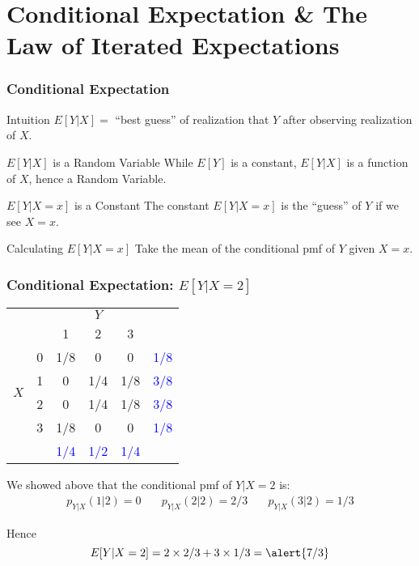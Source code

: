 \section{Conditional Expectation \& The Law of Iterated Expectations}
\begin{frame}
\frametitle{Conditional Expectation}
\begin{block}{Intuition}
	$E[Y|X] = $ ``best guess'' of realization that $Y$ after observing realization of $X$. 
\end{block}

\begin{block}{$E[Y|X]$ is a Random Variable}
While $E[Y]$ is a constant, $E[Y|X]$ is a function of $X$, hence a \alert{Random Variable}.
\end{block}

\begin{block}{$E[Y|X=x]$ is a Constant}
  The constant $E[Y|X=x]$ is the ``guess'' of $Y$ if we see $X=x$.
\end{block}

\begin{block}{Calculating $E[Y|X=x]$}
Take the mean of the conditional pmf of $Y$ given $X=x$.
\end{block}

\end{frame}
\begin{frame}
	\frametitle{Conditional Expectation: $E[Y|X=2]$}

\footnotesize
\begin{table}
\begin{tabular}{|cc|ccc|c|}
\hline
&&\multicolumn{3}{c|}{$Y$}&\\
&&1 & 2&3&\\
\hline
\multirow{4}{*}{$X$}
&0& \multicolumn{1}{|c}{\alert{1/8}} & \alert{0}& \alert{0}&\textcolor{blue}{1/8}\\
&1& \multicolumn{1}{|c}{\alert{0}} & \alert{1/4}&\alert{1/8}&\textcolor{blue}{3/8}\\
&2& \multicolumn{1}{|c}{\alert{0}} & \alert{1/4}&\alert{1/8}&\textcolor{blue}{3/8}\\
&3& \multicolumn{1}{|c}{\alert{1/8}} & \alert{0}&\alert{0}&\textcolor{blue}{1/8}\\
\hline
&&\textcolor{blue}{1/4}&\textcolor{blue}{1/2}&\textcolor{blue}{1/4}&\\
\hline
\end{tabular}
\end{table}

We showed above that the conditional pmf of $Y|X=2$ is:
	$$\boxed{\begin{array}{ccc}p_{Y|X}(1|2) =0 \quad&p_{Y|X}(2|2) =2/3 \quad&p_{Y|X}(3|2) =1/3\end{array}}$$
	
	
Hence
	$$E[Y|X=2] = 2 \times 2/3 + 3 \times 1/3 =  \alert{7/3}$$

\end{frame}
